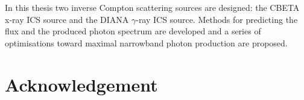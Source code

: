 \documentclass[11pt,oneside]{thesisformat}
\begin{document}
In this thesis two inverse Compton scattering sources are designed: the CBETA x-ray ICS source and the DIANA $\gamma$-ray ICS source. %
Methods for predicting the flux and the produced photon spectrum are developed and a series of optimisations toward maximal narrowband photon production are proposed. 


\chapter*{Acknowledgement}















%









\printbibliography



\appendix


\end{document}
